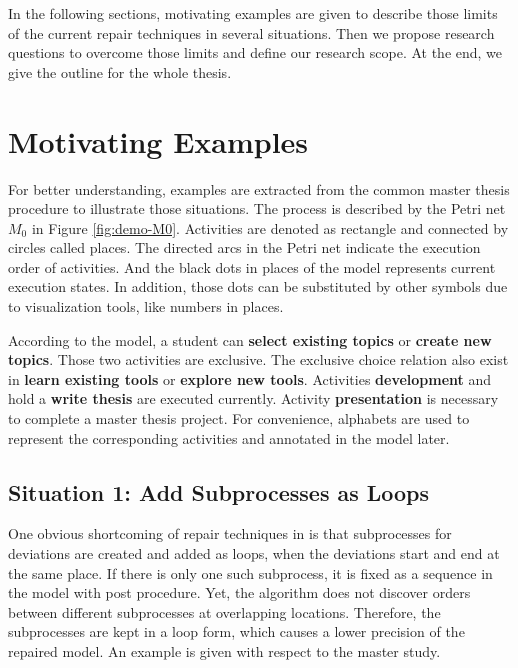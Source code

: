 In the following sections, motivating examples are given to describe those limits of the current repair techniques in several situations. Then we propose research questions to overcome those limits and define our research scope. At the end, we give the outline for the whole thesis.
\section{Motivating Examples}\label{sec:demo}

For better understanding, examples are extracted from the common master thesis procedure to illustrate those situations. The process is described by the Petri net $M_0$ in Figure \ref{fig:demo-M0}. Activities are denoted as rectangle and connected by circles called places. The directed arcs in the Petri net indicate the execution order of activities. And the black dots in places of the model represents current execution states. In addition, those dots can be substituted by other symbols due to visualization tools, like numbers in places.

According to the model, a student can \textbf{select existing topics}  or \textbf{create new topics}. Those two activities are exclusive. The exclusive choice relation also exist in  \textbf{learn existing tools}  or \textbf{explore new tools}. Activities \textbf{development} and hold a \textbf{write thesis} are executed currently. Activity \textbf{presentation} is necessary to complete a master thesis project. For convenience, alphabets are used to represent the corresponding activities and annotated in the model later.

\subsection{Situation 1: \small{Add Subprocesses as Loops}} %
One obvious shortcoming of repair techniques in \cite{fahland2015model} is that subprocesses for  deviations are created and added as loops, when the deviations start and end at the same place. If there is only one such subprocess, it is fixed as a sequence in the model with post procedure. Yet, the algorithm does not discover orders between different subprocesses at overlapping locations. Therefore, the subprocesses are kept in a loop form, which causes a lower precision of the repaired model. An example is given with respect to the master study. 

